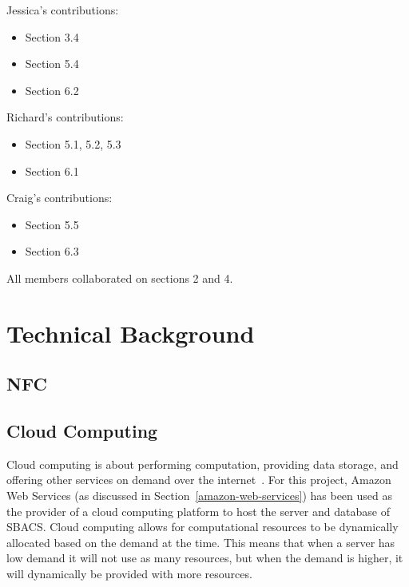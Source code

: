 \documentclass[12pt]{report}
\let\Oldsection\section
\renewcommand{\section}{\FloatBarrier\Oldsection}
\begin{document}
Jessica's contributions:
\begin{itemize}
\item Section 3.4
\item Section 5.4
\item Section 6.2
\end{itemize}

Richard's contributions:
\begin{itemize}
\item Section 5.1, 5.2, 5.3
\item Section 6.1
\end{itemize}

Craig's contributions:
\begin{itemize}
\item Section 5.5
\item Section 6.3
\end{itemize}

All members collaborated on sections 2 and 4.


\chapter{Technical Background} \label{technical-background}


\section{NFC} \label{nfc}


\section{Cloud Computing} \label{cloud-computing}

Cloud computing is about performing computation, providing data storage, and offering other services
on demand over the internet~\autocite{CLOUDCOMPUTING}. For this project, Amazon Web Services (as discussed
in Section~\ref{amazon-web-services})
has been used as the provider of a cloud computing platform to host the server and database of SBACS.
Cloud computing allows for computational resources to be dynamically allocated based on the demand
at the time. This means that when a server has low demand it will not use as many resources, but when
the demand is higher, it will dynamically be provided with more resources.
\end{document}
